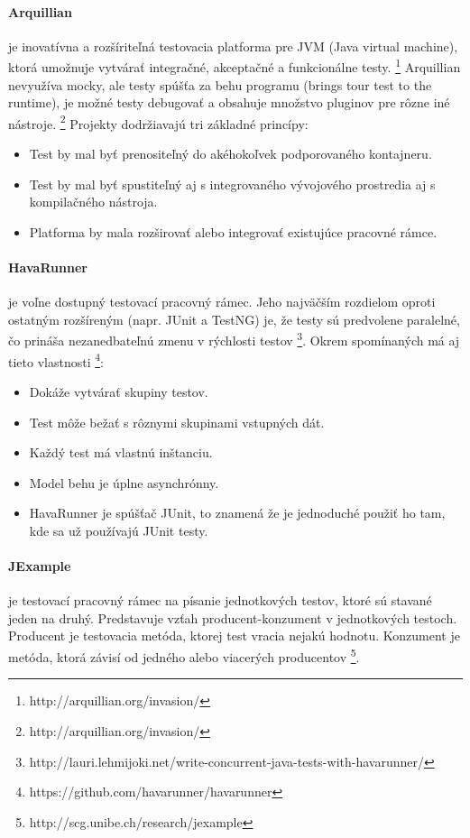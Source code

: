 \documentclass[11pt,twoside,slovak,a4paper]{article}
\begin{document}
	\paragraph{Arquillian} je inovatívna a rozšíriteľná testovacia platforma pre JVM (Java virtual machine), ktorá umožnuje vytvárať integračné, akceptačné a funkcionálne testy. \footnote{http://arquillian.org/invasion/} Arquillian nevyužíva mocky, ale testy spúšťa za behu programu (brings tour test to the runtime), je možné testy debugovať a obsahuje množstvo pluginov pre rôzne iné nástroje. \footnote{http://arquillian.org/invasion/}
	Projekty dodržiavajú tri základné princípy:
	\begin{itemize}
		\item Test by mal byť prenositeľný do akéhokoľvek podporovaného kontajneru.
		\item Test by mal byť spustiteľný aj s integrovaného vývojového prostredia aj s kompilačného nástroja.
		\item Platforma by mala rozširovať alebo integrovať existujúce pracovné rámce.
	\end{itemize}
	
	\paragraph{HavaRunner} je voľne dostupný testovací pracovný rámec. Jeho najväčším rozdielom oproti ostatným rozšíreným (napr. JUnit a TestNG) je, že testy sú predvolene paralelné, čo prináša nezanedbateľnú zmenu v rýchlosti testov \footnote{http://lauri.lehmijoki.net/write-concurrent-java-tests-with-havarunner/}.
	Okrem spomínaných má aj tieto vlastnosti \footnote{https://github.com/havarunner/havarunner}:
	\begin{itemize}
		\item Dokáže vytvárať skupiny testov.
		\item Test môže bežať s rôznymi skupinami vstupných dát.
		\item Každý test má vlastnú inštanciu.
		\item Model behu je úplne asynchrónny.
		\item HavaRunner je spúšťač JUnit, to znamená že je jednoduché použiť ho tam, kde sa už používajú JUnit testy.
	\end{itemize}
	
	\paragraph{JExample} je testovací pracovný rámec na písanie jednotkových testov, ktoré sú stavané jeden na druhý. Predstavuje vzťah producent-konzument v jednotkových testoch. Producent je testovacia metóda, ktorej test vracia nejakú hodnotu. Konzument je metóda, ktorá závisí od jedného alebo viacerých producentov \footnote{http://scg.unibe.ch/research/jexample}.
	
\end{document}
